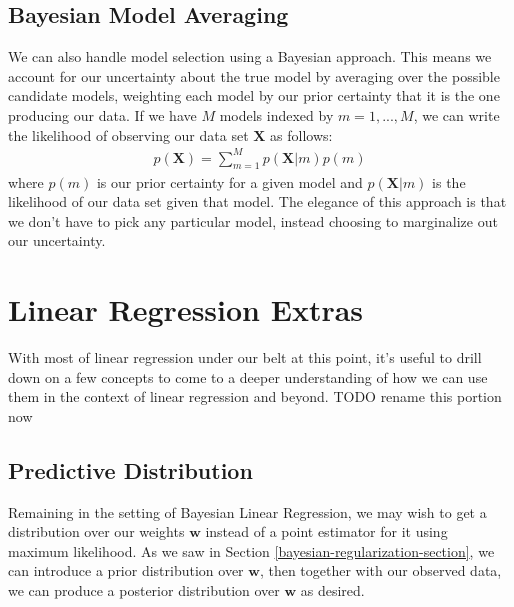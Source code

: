 \subsection{Bayesian Model Averaging}
We can also handle model selection using a Bayesian approach. This means we account for our uncertainty about the true model by averaging over the possible candidate models, weighting each model by our prior certainty that it is the one producing our data. If we have $M$ models indexed by $m = 1, ..., M$, we can write the likelihood of observing our data set $\textbf{X}$ as follows:
\begin{align*}
    p(\textbf{X}) = \sum_{m=1}^{M} p(\textbf{X}|m)p(m)
\end{align*}
where $p(m)$ is our prior certainty for a given model and $p(\textbf{X}|m)$ is the likelihood of our data set given that model. The elegance of this approach is that we don't have to pick any particular model, instead choosing to marginalize out our uncertainty.

\section{Linear Regression Extras}
With most of linear regression under our belt at this point, it's useful to drill down on a few concepts to come to a deeper understanding of how we can use them in the context of linear regression and beyond.
TODO rename this portion now
\subsection{Predictive Distribution}
Remaining in the setting of Bayesian Linear Regression, we may wish to get a distribution over our weights $\textbf{w}$ instead of a point estimator for it using maximum likelihood. As we saw in Section \ref{bayesian-regularization-section}, we can introduce a prior distribution over $\textbf{w}$, then together with our observed data, we can produce a posterior distribution over $\textbf{w}$ as desired.

